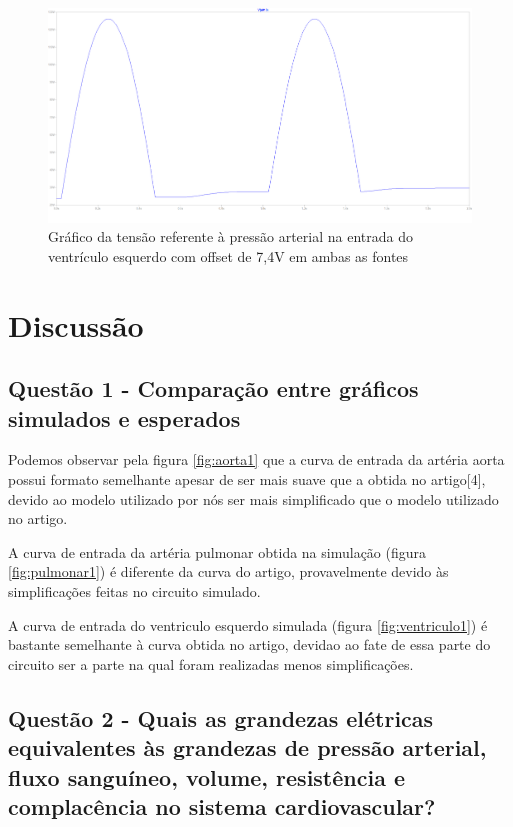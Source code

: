 \documentclass{abntex2}
\begin{document}
\begin{figure}[h]
  \centering
  \includegraphics[scale = 0.3]{ventriculo_esq_v174_v274.png}
  \caption{Gráfico da tensão referente à pressão arterial na entrada do ventrículo esquerdo com offset de 7,4V em ambas as fontes}
  \label{fig:ventriculo3}
\end{figure}

\chapter{Discussão}

\section{Questão 1 - Comparação entre gráficos simulados e esperados}

Podemos observar pela figura \ref{fig:aorta1} que a curva de entrada da artéria aorta possui formato semelhante apesar de ser mais suave que a obtida no artigo[4], devido ao modelo utilizado por nós ser mais simplificado que o modelo utilizado no artigo.

A curva de entrada da artéria pulmonar obtida na simulação (figura \ref{fig:pulmonar1}) é diferente da curva do artigo, provavelmente devido às simplificações feitas no circuito simulado.

A curva de entrada do ventriculo esquerdo simulada (figura \ref{fig:ventriculo1}) é bastante semelhante à curva obtida no artigo, devidao ao fate de essa parte do circuito ser a parte na qual foram realizadas menos simplificações.

\section{Questão 2 - Quais as grandezas elétricas equivalentes às grandezas de pressão arterial, fluxo sanguíneo, volume, resistência e complacência no sistema cardiovascular?}
\end{document}
